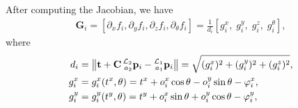 \documentclass[journal]{IEEEtran}
\newcommand{\norm}[1]{\left\lVert#1\right\rVert}
\def\LocPosHost{\prescript{\mathcal{L}_1}{a_1}{\mathbf{p}}} %
\def\LocPosTarg{\prescript{\mathcal{L}_2}{a_2}{\mathbf{p}}} %
\begin{document}
\begin{appendices}

\section{}\label{appendix:FIM_full}

After computing the Jacobian, we have
\begin{equation} \label{eq:G_i_original}
\begin{aligned}
    \mathbf{G}_i = 
    \left[
    \partial_x f_i, \partial_y f_i, \partial_z f_i, \partial_{\theta} f_i
    \right] 
    = \frac{1}{d_i} \left[
    g^x_i,\;g^y_i,\;g^z_i,\;g^{\theta}_i
    \right],
\end{aligned}
\end{equation}
where
\begin{equation*}
\begin{aligned}
    d_i 
    &= \norm{ \mathbf{t} + \mathbf{C} \LocPosTarg_i - \LocPosHost_i} 
    = \sqrt{(g^x_i)^2 + (g^y_i)^2 + (g^z_i)^2}, \\
    g^x_i &= g^x_i (t^x, \theta) 
    = t^x + o^x_i \cos{\theta}  - o^y_i \sin{\theta} - \varphi^x_i,\\
    g^y_i &= g^y_i (t^y, \theta) 
    = t^y + o^x_i \sin{\theta} + o^y_i \cos{\theta} - \varphi^y_i,\\

\end{aligned}
\end{equation*}
\end{appendices}
\end{document}
